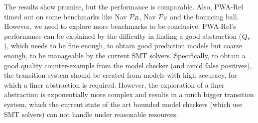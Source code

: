 
The results show promise, but the performance is comparable. Also,
PWA-Rel timed out on some benchmarks like Nav $\mathcal{P}_R$, Nav $\mathcal{P}_S$
and the bouncing ball. However, we need to explore more benchmarks to
be conclusive. PWA-Rel's performance can be explained by the
difficulty in finding a good abstraction ($Q_\epsilon$), which
needs to be fine enough, to obtain good prediction models but coarse
enough, to be manageable by the current SMT solvers. Specifically, to
obtain a good quality counter-example from the model checker (and
avoid false positives), the transition system should be created from
models with high accuracy, for which a finer abstraction is required.
However, the exploration of a finer abstraction is exponentially more
complex and results in a much bigger transition system, which the
current state of the art bounded model checkers (which use SMT
solvers) can not handle under reasonable resources.
